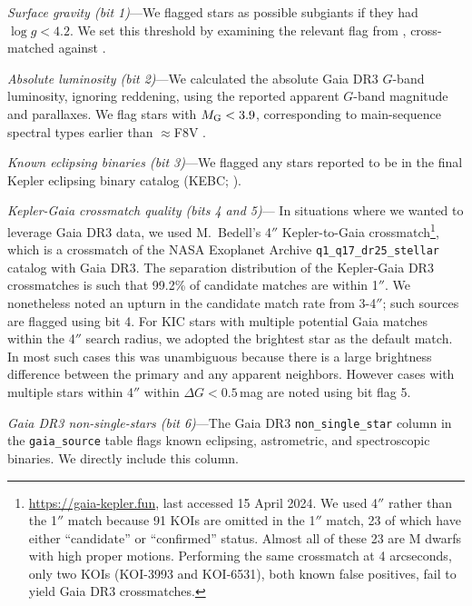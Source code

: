 \documentclass[11pt,twocolumn,tighten]{aastex63}
\begin{document}
{\it Surface gravity (bit 1)}---We flagged stars as possible subgiants
if they had $\log g < 4.2$.  We set this threshold by examining the
relevant flag from \citet{berger_2018_radii_evolnstates},
cross-matched against \citet{Berger_2020a_catalog}.

{\it Absolute luminosity (bit 2)}---We calculated the absolute Gaia
DR3 $G$-band luminosity, ignoring reddening, using the reported
apparent $G$-band magnitude and parallaxes.  We flag stars with
$M_{\rm G} < 3.9$, corresponding to main-sequence spectral types
earlier than $\approx$F8V \citep{Pecaut_2013}.

{\it Known eclipsing binaries (bit 3)}---We flagged any stars reported
to be in the final Kepler eclipsing binary catalog (KEBC;
\citealt{2016AJ....151...68K}).

{\it Kepler-Gaia crossmatch quality (bits 4 and 5)}--- In situations
where we wanted to leverage Gaia DR3 data, we used M.~Bedell's 4$''$
Kepler-to-Gaia crossmatch\footnote{\url{https://gaia-kepler.fun}, last
accessed 15 April 2024.  We used 4$''$ rather than the 1$''$ match
because 91 KOIs are omitted in the 1$''$ match, 23 of which have
either ``candidate'' or ``confirmed'' status.  Almost all of these 23
are M dwarfs with high proper motions.  Performing the same crossmatch
at 4 arcseconds, only two KOIs (KOI-3993 and KOI-6531), both known
false positives, fail to yield Gaia DR3 crossmatches.}, which is a
crossmatch of the NASA Exoplanet Archive
\texttt{q1\_q17\_dr25\_stellar} catalog with Gaia DR3.  The separation
distribution of the Kepler-Gaia DR3 crossmatches is such that 99.2\%
of candidate matches are within 1$''$.   We nonetheless noted an
upturn in the candidate match rate from 3-4$''$; such sources are
flagged using bit 4.  For KIC stars with multiple potential Gaia
matches within the 4$''$ search radius, we adopted the brightest star
as the default match.  In most such cases this was unambiguous because
there is a large brightness difference between the primary and any
apparent neighbors.  However cases with multiple stars within 4$''$
within $\Delta G$$<$$0.5$\,mag are noted using bit flag 5.  

{\it Gaia DR3 non-single-stars (bit 6)}---The Gaia DR3
\texttt{non\_single\_star} column in the \texttt{gaia\_source} table
flags known eclipsing, astrometric, and spectroscopic binaries.  We
directly include this column.
\end{document}
